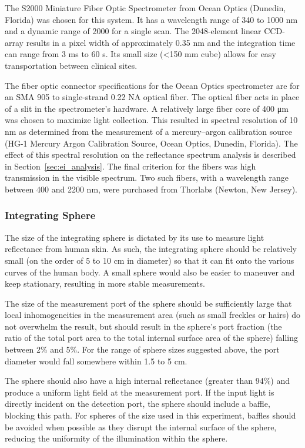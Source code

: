 The S2000 Miniature Fiber Optic Spectrometer from Ocean Optics (Dunedin, Florida) was chosen for this system. It has a wavelength range of 340 to 1000 nm and a dynamic range of 2000 for a single scan. The 2048-element linear CCD-array results in a pixel width of approximately 0.35 nm and the integration time can range from 3 ms to 60 s. Its small size (<150 mm cube) allows for easy transportation between clinical sites.

The fiber optic connector specifications for the Ocean Optics spectrometer are for an SMA 905 to single-strand 0.22 NA optical fiber. The optical fiber acts in place of a slit in the spectrometer’s hardware. A relatively large fiber core of 400 \si{\um} was chosen to maximize light collection. This resulted in spectral resolution of 10 nm as determined from the measurement of a mercury–argon calibration source (HG-1 Mercury Argon Calibration Source, Ocean Optics, Dunedin, Florida). The effect of this spectral resolution on the reflectance spectrum analysis is described in Section~\ref{sec:ei_analysis}. The final criterion for the fibers was high transmission in the visible spectrum. Two such fibers, with a wavelength range between 400 and 2200 nm, were purchased from Thorlabs (Newton, New Jersey).

\subsubsection{Integrating Sphere}
The size of the integrating sphere is dictated by its use to measure light reflectance from human skin. As such, the integrating sphere should be relatively small (on the order of 5 to 10 cm in diameter) so that it can fit onto the various curves of the human body. A small sphere would also be easier to maneuver and keep stationary, resulting in more stable measurements.

The size of the measurement port of the sphere should be sufficiently large that local inhomogeneities in the measurement area (such as small freckles or hairs) do not overwhelm the result, but should result in the sphere’s port fraction (the ratio of the total port area to the total internal surface area of the sphere) falling between 2\% and 5\%.\cite{Hanssen2002} For the range of sphere sizes suggested above, the port diameter would fall somewhere within 1.5 to 5 cm.

The sphere should also have a high internal reflectance (greater than 94\%) and produce a uniform light field at the measurement port.\cite{Labsphereb,Labspherea,Labsphere} If the input light is directly incident on the detection port, the sphere should include a baffle, blocking this path. For spheres of the size used in this experiment, baffles should be avoided when possible as they disrupt the internal surface of the sphere, reducing the uniformity of the illumination within the sphere.

